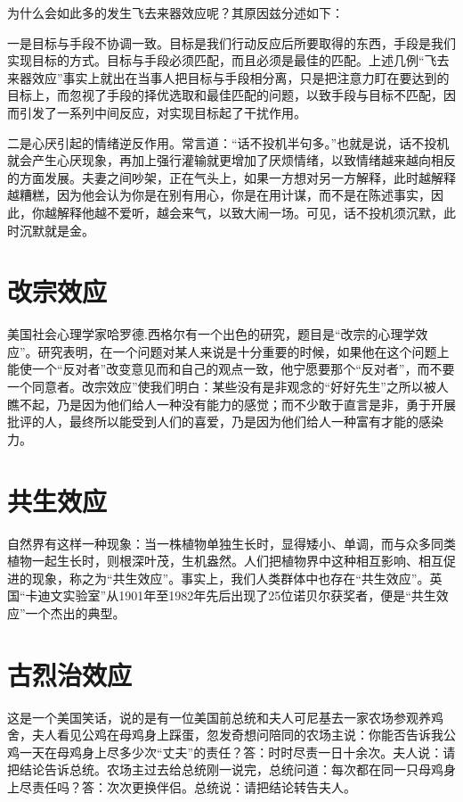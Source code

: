 \documentclass[11pt]{ctexart}
\begin{document}
为什么会如此多的发生飞去来器效应呢？其原因兹分述如下：

一是目标与手段不协调一致。目标是我们行动反应后所要取得的东西，手段是我们实现目标的方式。目标与手段必须匹配，而且必须是最佳的匹配。上述几例“飞去来器效应”事实上就出在当事人把目标与手段相分离，只是把注意力盯在要达到的目标上，而忽视了手段的择优选取和最佳匹配的问题，以致手段与目标不匹配，因而引发了一系列中间反应，对实现目标起了干扰作用。

二是心厌引起的情绪逆反作用。常言道：“话不投机半句多。”也就是说，话不投机就会产生心厌现象，再加上强行灌输就更增加了厌烦情绪，以致情绪越来越向相反的方面发展。夫妻之间吵架，正在气头上，如果一方想对另一方解释，此时越解释越糟糕，因为他会认为你是在别有用心，你是在用计谋，而不是在陈述事实，因此，你越解释他越不爱听，越会来气，以致大闹一场。可见，话不投机须沉默，此时沉默就是金。
\section{改宗效应}
\label{sec-38}


美国社会心理学家哈罗德.西格尔有一个出色的研究，题目是“改宗的心理学效应”。研究表明，在一个问题对某人来说是十分重要的时候，如果他在这个问题上能使一个“反对者”改变意见而和自己的观点一致，他宁愿要那个“反对者”，而不要一个同意者。改宗效应”使我们明白：某些没有是非观念的“好好先生”之所以被人瞧不起，乃是因为他们给人一种没有能力的感觉；而不少敢于直言是非，勇于开展批评的人，最终所以能受到人们的喜爱，乃是因为他们给人一种富有才能的感染力。
\section{共生效应}
\label{sec-39}


自然界有这样一种现象：当一株植物单独生长时，显得矮小、单调，而与众多同类植物一起生长时，则根深叶茂，生机盎然。人们把植物界中这种相互影响、相互促进的现象，称之为“共生效应”。事实上，我们人类群体中也存在“共生效应”。英国“卡迪文实验室”从1901年至1982年先后出现了25位诺贝尔获奖者，便是“共生效应”一个杰出的典型。
\section{古烈治效应}
\label{sec-40}


这是一个美国笑话，说的是有一位美国前总统和夫人可尼基去一家农场参观养鸡舍，夫人看见公鸡在母鸡身上踩蛋，忽发奇想问陪同的农场主说：你能否告诉我公鸡一天在母鸡身上尽多少次“丈夫”的责任？答：时时尽责一日十余次。夫人说：请把结论告诉总统。农场主过去给总统刚一说完，总统问道：每次都在同一只母鸡身上尽责任吗？答：次次更换伴侣。总统说：请把结论转告夫人。
\end{document}
